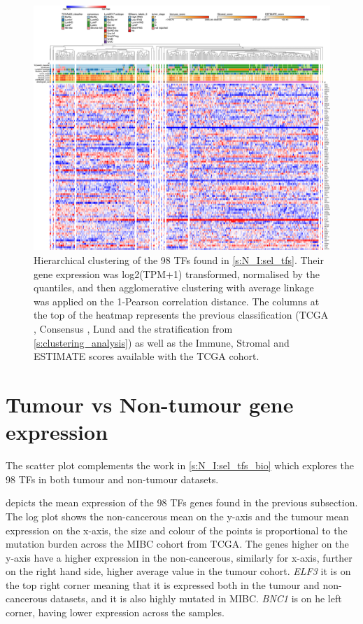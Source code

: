 \begin{figure}
    \centering
    \includegraphics[width=1.0\textwidth,keepaspectratio]{Sections/Network_I/Resources/selective_pruning/15_CS_norm_sel_tfs.png}
      \caption[Heatmap of the clustering of the gene expression of the 98 TFs]{Hierarchical clustering of the 98 TFs found in \cref{s:N_I:sel_tfs}. 
      Their gene expression was log2(TPM+1) transformed, normalised by the quantiles, and then agglomerative clustering with average linkage was applied on the 1-Pearson correlation distance. The columns at the top of the heatmap represents the previous classification (TCGA \cite{Robertson2017-mg}, Consensus \cite{Kamoun2020-tj}, Lund \cite{Marzouka2018-ge} and the stratification from \cref{s:clustering_analysis}) as well as the Immune, Stromal and ESTIMATE scores available with the TCGA cohort.}
    \label{fig:ap:morph_sel_tfs}
\end{figure}

\section{Tumour vs Non-tumour gene expression} \label{s:ap:tum_vs_non-tumour}


The scatter plot complements the work in \cref{s:N_I:sel_tfs_bio} which explores the 98 TFs in both tumour and non-tumour datasets.

 depicts the mean expression of the 98 TFs genes found in the previous subsection. The log plot shows the non-cancerous mean on the y-axis and the tumour mean expression on the x-axis, the size and colour of the points is proportional to the mutation burden across the MIBC cohort from TCGA. The genes higher on the y-axis have a higher expression in the non-cancerous, similarly for x-axis, further on the right hand side, higher average value in the tumour cohort. \textit{ELF3} it is on the top right corner meaning that it is expressed both in the tumour and non-cancerous datasets, and it is also highly mutated in MIBC. \textit{BNC1} is on he left corner, having lower expression across the samples.


